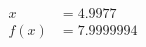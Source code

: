\documentclass[preview]{standalone}
\begin{document}
\begin{align*}
x &= 4.9977\\f(x) &= 7.9999994
\end{align*}
\end{document}
